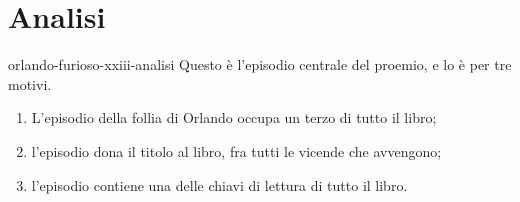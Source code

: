 \documentclass[preview]{standalone}
\begin{document}
\genpage

\section{Analisi}

\begin{snippet}{orlando-furioso-xxiii-analisi}
    Questo è l'episodio centrale del proemio, e lo è per tre motivi.
    \begin{enumerate}
        \item L'episodio della follia di Orlando occupa un terzo di tutto il libro;
        \item l'episodio dona il titolo al libro, fra tutti le vicende che avvengono;
        \item l'episodio contiene una delle chiavi di lettura di tutto il libro.
    \end{enumerate}


\end{snippet}
\end{document}
